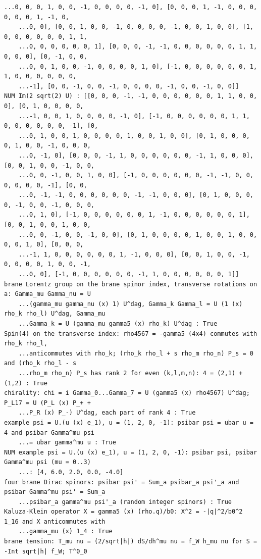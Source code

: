 \documentclass[10pt,a4paper]{article}
\begin{document}
\begin{Verbatim}[fontsize=\small,frame=single,framesep=2mm]
    ...0, 0, 0, 1, 0, 0, -1, 0, 0, 0, 0, -1, 0], [0, 0, 0, 1, -1, 0, 0, 0, 0, 0, 0, 1, -1, 0,
    ...0, 0], [0, 0, 1, 0, 0, -1, 0, 0, 0, 0, -1, 0, 0, 1, 0, 0], [1, 0, 0, 0, 0, 0, 0, 1, 1,
    ...0, 0, 0, 0, 0, 0, 1], [0, 0, 0, -1, -1, 0, 0, 0, 0, 0, 0, 1, 1, 0, 0, 0], [0, -1, 0, 0,
    ...0, 0, 1, 0, 0, -1, 0, 0, 0, 0, 1, 0], [-1, 0, 0, 0, 0, 0, 0, 1, 1, 0, 0, 0, 0, 0, 0,
    ...-1], [0, 0, -1, 0, 0, -1, 0, 0, 0, 0, -1, 0, 0, -1, 0, 0]]
NUM Im(2 sqrt(2) U) : [[0, 0, 0, -1, -1, 0, 0, 0, 0, 0, 0, 1, 1, 0, 0, 0], [0, 1, 0, 0, 0, 0,
    ...-1, 0, 0, 1, 0, 0, 0, 0, -1, 0], [-1, 0, 0, 0, 0, 0, 0, 1, 1, 0, 0, 0, 0, 0, 0, -1], [0,
    ...0, 1, 0, 0, 1, 0, 0, 0, 0, 1, 0, 0, 1, 0, 0], [0, 1, 0, 0, 0, 0, 1, 0, 0, -1, 0, 0, 0,
    ...0, -1, 0], [0, 0, 0, -1, 1, 0, 0, 0, 0, 0, 0, -1, 1, 0, 0, 0], [0, 0, 1, 0, 0, -1, 0, 0,
    ...0, 0, -1, 0, 0, 1, 0, 0], [-1, 0, 0, 0, 0, 0, 0, -1, -1, 0, 0, 0, 0, 0, 0, -1], [0, 0,
    ...0, -1, -1, 0, 0, 0, 0, 0, 0, -1, -1, 0, 0, 0], [0, 1, 0, 0, 0, 0, -1, 0, 0, -1, 0, 0, 0,
    ...0, 1, 0], [-1, 0, 0, 0, 0, 0, 0, 1, -1, 0, 0, 0, 0, 0, 0, 1], [0, 0, 1, 0, 0, 1, 0, 0,
    ...0, 0, -1, 0, 0, -1, 0, 0], [0, 1, 0, 0, 0, 0, 1, 0, 0, 1, 0, 0, 0, 0, 1, 0], [0, 0, 0,
    ...-1, 1, 0, 0, 0, 0, 0, 0, 1, -1, 0, 0, 0], [0, 0, 1, 0, 0, -1, 0, 0, 0, 0, 1, 0, 0, -1,
    ...0, 0], [-1, 0, 0, 0, 0, 0, 0, -1, 1, 0, 0, 0, 0, 0, 0, 1]]
brane Lorentz group on the brane spinor index, transverse rotations on a: Gamma_mu Gamma_nu = U
    ...(gamma_mu gamma_nu (x) 1) U^dag, Gamma_k Gamma_l = U (1 (x) rho_k rho_l) U^dag, Gamma_mu
    ...Gamma_k = U (gamma_mu gamma5 (x) rho_k) U^dag : True
Spin(4) on the transverse index: rho4567 = -gamma5 (4x4) commutes with rho_k rho_l,
    ...anticommutes with rho_k; (rho_k rho_l + s rho_m rho_n) P_s = 0 and (rho_k rho_l - s
    ...rho_m rho_n) P_s has rank 2 for even (k,l,m,n): 4 = (2,1) + (1,2) : True
chirality: chi = i Gamma_0...Gamma_7 = U (gamma5 (x) rho4567) U^dag; P_L17 = U (P_L (x) P_+ +
    ...P_R (x) P_-) U^dag, each part of rank 4 : True
example psi = U.(u (x) e_1), u = (1, 2, 0, -1): psibar psi = ubar u = 4 and psibar Gamma^mu psi
    ...= ubar gamma^mu u : True
NUM example psi = U.(u (x) e_1), u = (1, 2, 0, -1): psibar psi, psibar Gamma^mu psi (mu = 0..3)
    ...: [4, 6.0, 2.0, 0.0, -4.0]
four brane Dirac spinors: psibar psi' = Sum_a psibar_a psi'_a and psibar Gamma^mu psi' = Sum_a
    ...psibar_a gamma^mu psi'_a (random integer spinors) : True
Kaluza-Klein operator X = gamma5 (x) (rho.q)/b0: X^2 = -|q|^2/b0^2 1_16 and X anticommutes with
    ...gamma_mu (x) 1_4 : True
brane tension: T_mu nu = (2/sqrt|h|) dS/dh^mu nu = f_W h_mu nu for S = -Int sqrt|h| f_W; T^0_0

\end{Verbatim}
\end{document}

